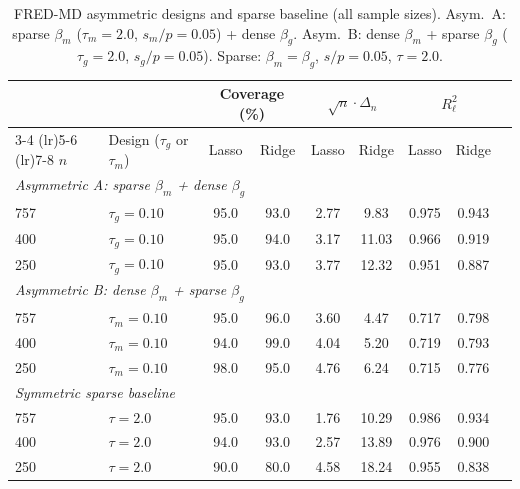 \documentclass[a4paper,10.5pt]{article}
\begin{document}
\begin{table}[H]
\centering
\small
\caption{FRED-MD asymmetric designs and sparse baseline (all sample sizes). Asym.~A: sparse $\beta_m$ ($\tau_m = 2.0$, $s_m/p = 0.05$) + dense $\beta_g$. Asym.~B: dense $\beta_m$ + sparse $\beta_g$ ($\tau_g = 2.0$, $s_g/p = 0.05$). Sparse: $\beta_m = \beta_g$, $s/p = 0.05$, $\tau = 2.0$.}
\label{tab:app_fredmd_asym}
\begin{tabular}{llccccccc}
\toprule
& & \multicolumn{2}{c}{Coverage (\%)} & \multicolumn{2}{c}{$\sqrt{n}\cdot\Delta_n$} & \multicolumn{2}{c}{$R^2_\ell$} \\
\cmidrule(lr){3-4} \cmidrule(lr){5-6} \cmidrule(lr){7-8}
$n$ & Design ($\tau_g$ or $\tau_m$) & Lasso & Ridge & Lasso & Ridge & Lasso & Ridge \\
\midrule
\multicolumn{8}{l}{\textit{Asymmetric A: sparse $\beta_m$ + dense $\beta_g$}} \\
757 & $\tau_g = 0.10$ & 95.0 & 93.0 & 2.77 & 9.83 & 0.975 & 0.943 \\
400 & $\tau_g = 0.10$ & 95.0 & 94.0 & 3.17 & 11.03 & 0.966 & 0.919 \\
250 & $\tau_g = 0.10$ & 95.0 & 93.0 & 3.77 & 12.32 & 0.951 & 0.887 \\
\midrule
\multicolumn{8}{l}{\textit{Asymmetric B: dense $\beta_m$ + sparse $\beta_g$}} \\
757 & $\tau_m = 0.10$ & 95.0 & 96.0 & 3.60 & 4.47 & 0.717 & 0.798 \\
400 & $\tau_m = 0.10$ & 94.0 & 99.0 & 4.04 & 5.20 & 0.719 & 0.793 \\
250 & $\tau_m = 0.10$ & 98.0 & 95.0 & 4.76 & 6.24 & 0.715 & 0.776 \\
\midrule
\multicolumn{8}{l}{\textit{Symmetric sparse baseline}} \\
757 & $\tau = 2.0$ & 95.0 & 93.0 & 1.76 & 10.29 & 0.986 & 0.934 \\
400 & $\tau = 2.0$ & 94.0 & 93.0 & 2.57 & 13.89 & 0.976 & 0.900 \\
250 & $\tau = 2.0$ & 90.0 & 80.0 & 4.58 & 18.24 & 0.955 & 0.838 \\
\bottomrule
\end{tabular}
\end{table}
\end{document}
